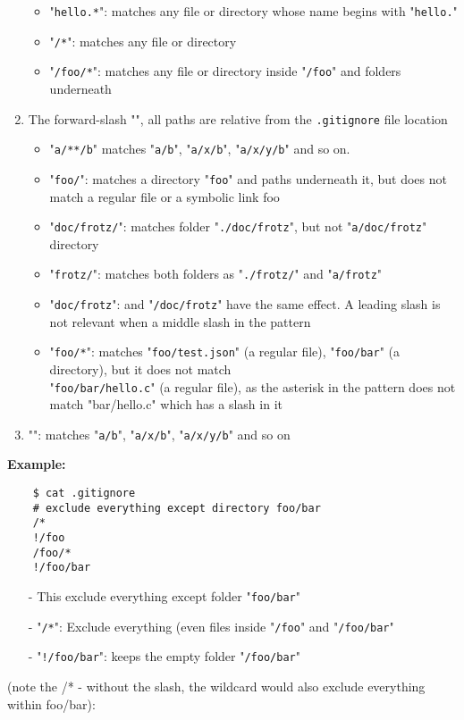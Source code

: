\begin{enumerate}
\begin{itemize}
\item "\texttt{hello.*}": matches any file or directory whose name begins with "\texttt{hello.}"
\item "\texttt{/*}": matches any file or directory 
\item "\texttt{/foo/*}": matches any file or directory inside "\texttt{/foo}" and folders underneath
\end{itemize}
\item The forward-slash "\TT{/}", all paths are relative from the \texttt{.gitignore} file location
\begin{itemize}\packed
\item "\texttt{a/**/b}" matches "\texttt{a/b}", "\texttt{a/x/b}", "\texttt{a/x/y/b}" and so on.
\item "\texttt{foo/}": matches a directory "\texttt{foo}" and paths underneath it, but does not match a regular file or a symbolic link foo 
\item "\texttt{doc/frotz/}": matches folder "\texttt{./doc/frotz}", but not "\texttt{a/doc/frotz}" directory
\item "\texttt{frotz/}": matches both folders as "\texttt{./frotz/}" and "\texttt{a/frotz}" 
\item "\texttt{doc/frotz}": and "\texttt{/doc/frotz}" have the same effect. A leading slash is not relevant when a middle slash in the pattern
\item "\texttt{foo/*}": matches "\texttt{foo/test.json}" (a regular file), "\texttt{foo/bar}" (a directory), but it does not match \\
"\texttt{foo/bar/hello.c}" (a regular file), as the asterisk in the pattern does not match "bar/hello.c" which has a slash in it
\end{itemize}
\item "": matches "\texttt{a/b}", "\texttt{a/x/b}", "\texttt{a/x/y/b}" and so on
\end{enumerate}

\nl\textbf{Example:}
\begin{verbatim}
    $ cat .gitignore
    # exclude everything except directory foo/bar
    /*
    !/foo
    /foo/*
    !/foo/bar
\end{verbatim}
\begin{itemize}\packed
\item[-] This exclude everything except folder "\texttt{foo/bar}"
\item[-] "\texttt{/*}": Exclude everything (even files inside "\texttt{/foo}" and "\texttt{/foo/bar}"
\item[-] "\texttt{!/foo/bar}": keeps the empty folder "\texttt{/foo/bar}"
\end{itemize}
 (note the /* - without the slash, the wildcard would also exclude everything within foo/bar):

